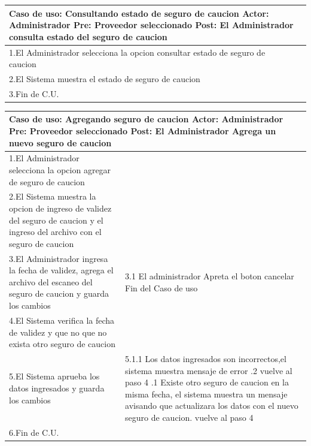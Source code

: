 \begin{longtable}{|p{}|p{}|}
    \hline
    \multicolumn{2}{|p{16cm}|}{
        \textbf{Caso de uso:} Consultando estado de seguro de caucion \newline
        \textbf{Actor:} Administrador\newline
        \textbf{Pre: }  Proveedor seleccionado \newline
        \textbf{Post:} El Administrador consulta estado del seguro de caucion
    }\\
    \hline
    1.El Administrador selecciona la opcion consultar estado de seguro de caucion&  \\
    \hline
    2.El Sistema muestra el estado de seguro de caucion&  \\
    \hline
    3.Fin de C.U.& \\
    \hline
\end{longtable}

\begin{longtable}{|p{}|p{}|}
    \hline
    \multicolumn{2}{|p{16cm}|}{
        \textbf{Caso de uso:} Agregando seguro de caucion\newline
        \textbf{Actor:} Administrador\newline
        \textbf{Pre: }  Proveedor seleccionado\newline
        \textbf{Post:} El Administrador Agrega un nuevo seguro de caucion
    }\\
    \hline
    1.El Administrador selecciona la opcion agregar de seguro de caucion& \\
    \hline
    2.El Sistema muestra la opcion de ingreso de validez del seguro de caucion y el ingreso del archivo con el seguro de caucion&  \\
    \hline
    3.El Administrador ingresa la fecha de validez, agrega el archivo del escaneo del seguro de caucion y guarda los cambios&3.1 El administrador Apreta el boton cancelar \newline 3.2 Fin del Caso de uso \\
    \hline
    4.El Sistema verifica la fecha de validez y que no que no exista otro seguro de caucion & \\
    \hline
    5.El Sistema aprueba los datos ingresados y guarda los cambios &5.1.1 Los datos ingresados son incorrectos,el sistema muestra mensaje de error \newline 5.1.2 vuelve al paso 4 \newline 5.2.1 Existe otro seguro de caucion en la misma fecha, el sistema muestra un mensaje avisando que actualizara los datos con el nuevo seguro de caucion. \newline 5.2 vuelve al paso 4\\
    \hline
    6.Fin de C.U.& \\
    \hline
\end{longtable}

